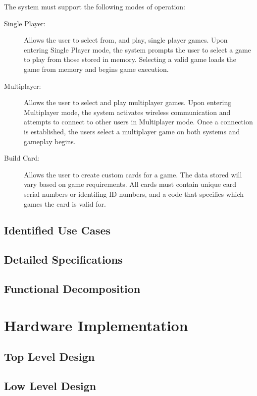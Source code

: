 \documentclass[12pt]{article} %
\begin{document}
The system must support the following modes of operation:

\begin{description}
	\item[Single Player:] Allows the user to select from, and play, single player
		games. Upon entering Single Player mode, the system prompts the user to
		select a game to play from those stored in memory. Selecting a valid game
		loads the game from memory and begins game execution.
	\item[Multiplayer:] Allows the user to select and play multiplayer games.
		Upon entering Multiplayer mode, the system activates wireless communication
		and attempts to connect to other users in Multiplayer mode. Once a
		connection is established, the users select a multiplayer game on both
		systems and gameplay begins.
	\item[Build Card:] Allows the user to create custom cards for a game. The
		data stored will vary based on game requirements. All cards must contain
		unique card serial numbers or identifing ID numbers, and a code that
		specifies which games the card is valid for.
\end{description}

\subsection{Identified Use Cases}\label{sec:identifiedUseCases} %

\subsection{Detailed Specifications}\label{detailedSpec} %

\subsection{Functional Decomposition}\label{functions} %

\section{Hardware Implementation}\label{hwImplementation} 

\subsection{Top Level Design}\label{hwTopLevel} %

\subsection{Low Level Design}\label{hwLowLevel} %
\end{document}
